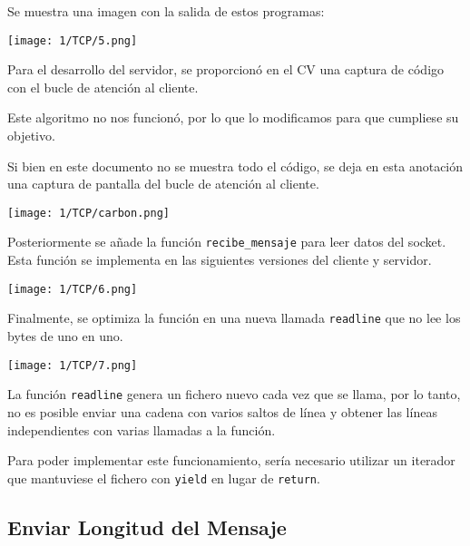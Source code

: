Se muestra una imagen con la salida de estos programas:

\begin{minipage}{\linewidth}
	\centering
	\texttt{[image: 1/TCP/5.png]}
	\label{fig:1/7}
\end{minipage}

\begin{notebox}
    Para el desarrollo del servidor,
    se proporcionó en el CV una captura de código
    con el bucle de atención al cliente.

    Este algoritmo no nos funcionó,
    por lo que lo modificamos para que cumpliese su objetivo.

    Si bien en este documento no se muestra todo el código,
    se deja en esta anotación una captura de pantalla del bucle
    de atención al cliente.

	\texttt{[image: 1/TCP/carbon.png]}
\end{notebox}

Posteriormente se añade la función \verb#recibe_mensaje#
para leer datos del socket.
Esta función se implementa en las siguientes versiones del cliente
y servidor.

\begin{minipage}{\linewidth}
	\centering
	\texttt{[image: 1/TCP/6.png]}
	\label{fig:1/8}
\end{minipage}

Finalmente, se optimiza la función en una nueva llamada \verb#readline#
que no lee los bytes de uno en uno.

\begin{minipage}{\linewidth}
	\centering
	\texttt{[image: 1/TCP/7.png]}
	\label{fig:1/9}
\end{minipage}

La función \verb#readline# genera un fichero nuevo cada vez que se llama,
por lo tanto, no es posible enviar una cadena con varios saltos
de línea y obtener las líneas independientes con varias llamadas a la
función.

Para poder implementar este funcionamiento,
sería necesario utilizar un iterador que mantuviese el fichero
con \verb#yield# en lugar de \verb#return#.

\subsection{Enviar Longitud del Mensaje}

